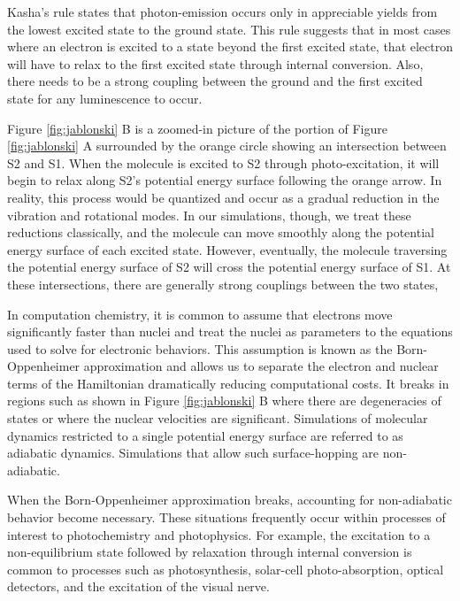 Kasha's rule states that photon-emission occurs only in appreciable yields from the lowest excited state to the ground state.\cite{Kasha1950}
This rule suggests that in most cases where an electron is excited to a state beyond the first excited state, that electron will have to relax to the first excited state through internal conversion.\cite{shenai2016internal}
Also, there needs to be a strong coupling between the ground and the first excited state for any luminescence to occur.

Figure \ref{fig:jablonski} B is a zoomed-in picture of the portion of Figure \ref{fig:jablonski} A surrounded by the orange circle showing an intersection between S2 and S1.
When the molecule is excited to S2 through photo-excitation, it will begin to relax along S2's potential energy surface following the orange arrow.
In reality, this process would be quantized and occur as a gradual reduction in the vibration and rotational modes.
In our simulations, though, we treat these reductions classically, and the molecule can move smoothly along the potential energy surface of each excited state. 
However, eventually, the molecule traversing the potential energy surface of S2 will cross the potential energy surface of S1.
At these intersections, there are generally strong couplings between the two states, 

In computation chemistry, it is common to assume that electrons move significantly faster than nuclei and treat the nuclei as parameters to the equations used to solve for electronic behaviors.
This assumption is known as the Born-Oppenheimer approximation and allows us to separate the electron and nuclear terms of the Hamiltonian dramatically reducing computational costs.
It breaks in regions such as shown in Figure \ref{fig:jablonski} B where there are degeneracies of states or where the nuclear velocities are significant.
Simulations of molecular dynamics restricted to a single potential energy surface are referred to as adiabatic dynamics.
Simulations that allow such surface-hopping are non-adiabatic.

When the Born-Oppenheimer approximation breaks, accounting for non-adiabatic behavior become necessary.
These situations frequently occur within processes of interest to photochemistry and photophysics.
For example, the excitation to a non-equilibrium state followed by relaxation through internal conversion is common to processes such as photosynthesis, solar-cell photo-absorption, optical detectors, and the excitation of the visual nerve.
\cite{vincent2016little}

